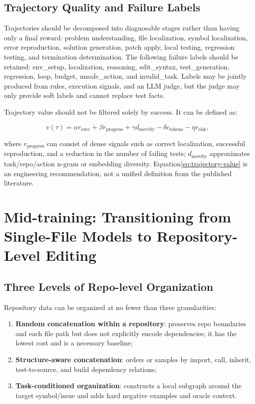 \documentclass[10pt,a4paper,UTF8,fontset=none]{ctexart}
\newcommand{\ident}[1]{{\rmfamily #1}}
\begin{document}
\subsection{Trajectory Quality and Failure Labels}

Trajectories should be decomposed into diagnosable stages rather than having only a final reward: problem understanding, file localization, symbol localization, error reproduction, solution generation, patch apply, local testing, regression testing, and termination determination. The following failure labels should be retained: \ident{env\_setup}, \ident{localization}, \ident{reasoning}, \ident{edit\_syntax}, \ident{test\_generation}, \ident{regression}, \ident{loop}, \ident{budget}, \ident{unsafe\_action}, and \ident{invalid\_task}. Labels may be jointly produced from rules, execution signals, and an LLM judge, but the judge may only provide soft labels and cannot replace test facts.

Trajectory value should not be filtered solely by success. It can be defined as:

\begin{equation}
v(\tau)=\alpha r_{\mathrm{exec}}+\beta r_{\mathrm{progress}}+\gamma d_{\mathrm{novelty}}-\delta c_{\mathrm{tokens}}-\eta r_{\mathrm{risk}},
\label{eq:trajectory-value}
\end{equation}

where $r_{\mathrm{progress}}$ can consist of dense signals such as correct localization, successful reproduction, and a reduction in the number of failing tests; $d_{\mathrm{novelty}}$ approximates task/repo/action n-gram or embedding diversity. Equation\eqref{eq:trajectory-value} is an engineering recommendation, not a unified definition from the published literature.

\section{Mid-training: Transitioning from Single-File Models to Repository-Level Editing}

\subsection{Three Levels of Repo-level Organization}

Repository data can be organized at no fewer than three granularities:

\begin{enumerate}
  \item \textbf{Random concatenation within a repository}: preserves repo boundaries and each file path but does not explicitly encode dependencies; it has the lowest cost and is a necessary baseline;
  \item \textbf{Structure-aware concatenation}: orders or samples by import, call, inherit, test-to-source, and build dependency relations;
  \item \textbf{Task-conditioned organization}: constructs a local subgraph around the target symbol/issue and adds hard negative examples and oracle context.
\end{enumerate}
\end{document}
